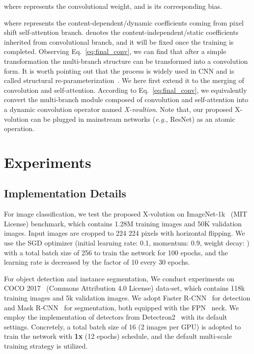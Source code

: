 \documentclass{article}
\begin{document}
where  represents the convolutional weight, and  is its corresponding bias.

where {\small{}} represents the content-dependent/dynamic coefficients coming from pixel shift self-attention branch.
 denotes the content-independent/static coefficients inherited from convolutional branch, and it will be fixed once the training is completed.
Observing Eq.~\ref{eq:final_conv}, we can find that after a simple transformation the multi-branch structure can be transformed into a convolution form.
It is worth pointing out that the process is widely used in CNN and is called structural re-parameterization~\cite{DBLP:journals/corr/abs-2101-03697}.
We here first extend it to the merging of convolution and self-attention.
According to Eq.~\ref{eq:final_conv}, we equivalently convert the multi-branch module composed of convolution and self-attention into a dynamic convolution operator named \emph{X-voultion}.
Note that, our proposed X-volution can be plugged in mainstream networks (\emph{e.g.}, ResNet) as an atomic operation.











\section{Experiments}
\subsection{Implementation Details}
\label{sec_4_1}
For image classification, we test the proposed X-volution on ImageNet-1k~\cite{DBLP:journals/ijcv/RussakovskyDSKS15} (MIT License) benchmark, which contains 1.28M training images and 50K validation images. Input images are cropped to 224  224 pixels with horizontal flipping. We use the SGD optimizer (initial learning rate: 0.1, momentum: 0.9, weight decay: ) with a total batch size of 256 to train the network for 100 epochs, and the learning rate is decreased by the factor of 10 every 30 epochs. 

For object detection and instance segmentation, We conduct experiments on COCO 2017~\cite{DBLP:conf/eccv/LinMBHPRDZ14} (Commons Attribution 4.0 License) data-set, which contains 118k training images and 5k validation images. 
We adopt Faster R-CNN~\cite{DBLP:conf/nips/RenHGS15} for detection and Mask R-CNN~\cite{DBLP:conf/iccv/HeGDG17} for segmentation, both equipped with the FPN~\cite{DBLP:conf/cvpr/LinDGHHB17} neck. 
We employ the implementation of detectors from Detectron2~\cite{wu2019detectron2} with its default settings.
Concretely, a total batch size of 16 (2 images per GPU) is adopted to train the network with \textbf{1x} (12 epochs) schedule, and the default multi-scale training strategy is utilized. 
\end{document}
